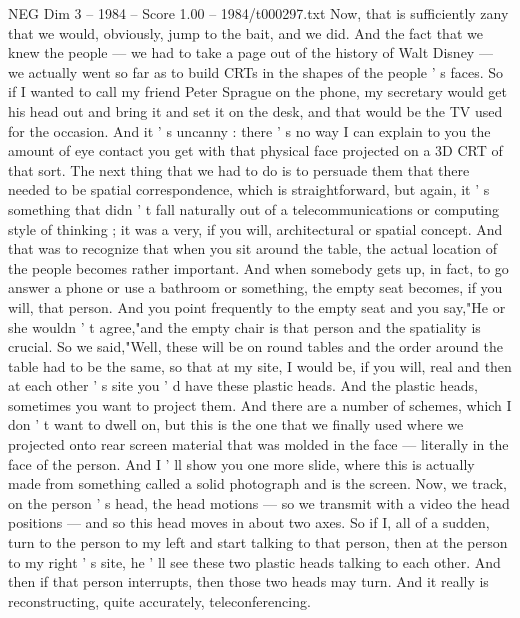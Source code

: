 \begin{textsample}{NEG Dim 3 – 1984 – Score 1.00 – 1984/t000297.txt}
Now, that is sufficiently zany that we would, obviously, jump to the bait, and we did.
And the fact that we knew the people — we had to take a page out of the history of Walt Disney — we actually went so far as to build CRTs in the shapes of the people ' s faces.
So if I wanted to call my friend Peter Sprague on the phone, my secretary would get his head out and bring it and set it on the desk, and that would be the TV used for the occasion.
And it ' s uncanny : there ' s no way I can explain to you the amount of eye contact you get with that physical face projected on a 3D CRT of that sort.
The next thing that we had to do is to persuade them that there needed to be spatial correspondence, which is straightforward, but again, it ' s something that didn ' t fall naturally out of a telecommunications or computing style of thinking ; it was a very, if you will, architectural or spatial concept.
And that was to recognize that when you sit around the table, the actual location of the people becomes rather important.
And when somebody gets up, in fact, to go answer a phone or use a bathroom or something, the empty seat becomes, if you will, that person.
And you point frequently to the empty seat and you say,"He or she wouldn ' t agree,"and the empty chair is that person and the spatiality is crucial.
So we said,"Well, these will be on round tables and the order around the table had to be the same, so that at my site, I would be, if you will, real and then at each other ' s site you ' d have these plastic heads.
And the plastic heads, sometimes you want to project them.
And there are a number of schemes, which I don ' t want to dwell on, but this is the one that we finally used where we projected onto rear screen material that was molded in the face — literally in the face of the person.
And I ' ll show you one more slide, where this is actually made from something called a solid photograph and is the screen.
Now, we track, on the person ' s head, the head motions — so we transmit with a video the head positions — and so this head moves in about two axes.
So if I, all of a sudden, turn to the person to my left and start talking to that person, then at the person to my right ' s site, he ' ll see these two plastic heads talking to each other.
And then if that person interrupts, then those two heads may turn.
And it really is reconstructing, quite accurately, teleconferencing.

\end{textsample}
